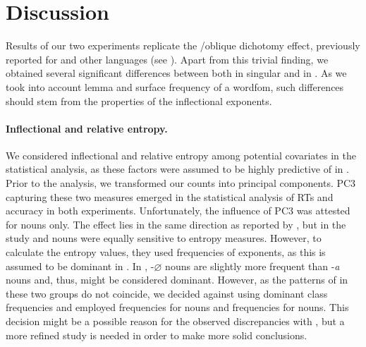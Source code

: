 \documentclass[output=paper, modfonts,newtxmath,hidelinks]{langscibook}
\begin{document}
\section{Discussion}
Results of our two experiments replicate the \slash oblique dichotomy effect, previously reported for  and other languages (see ). Apart from this trivial finding, we obtained several significant differences between   both in singular and in . As we took into account lemma and surface frequency of a wordfom, such   differences should stem from the properties of the inflectional exponents.\\

\paragraph*{Inflectional and relative entropy.} We considered inflectional and relative entropy among potential covariates in the statistical analysis, as these factors were assumed to be highly predictive of   in  \citep{milin2009simultaneous}. Prior to the analysis, we transformed our counts into principal components. PC3 capturing these two measures emerged in the statistical analysis of RTs and accuracy in both experiments. Unfortunately, the influence of PC3 was attested for  nouns only. The effect lies in the same direction as reported by \citet*{milin2009simultaneous}, but in the  study  and  nouns were equally sensitive to entropy measures. However, to calculate the entropy values, they used frequencies of  exponents, as this  is assumed to be dominant in . In ,  -$\varnothing$ nouns are slightly more frequent than  -\textit{a} nouns \citep{samojlova2014frequencies} and, thus, might be considered dominant. However, as the patterns of  in these two  groups do not coincide, we decided against using dominant class frequencies and employed  frequencies for  nouns and  frequencies for  nouns. This decision might be a possible reason for the observed discrepancies with \citet{milin2009simultaneous}, but a more refined study is needed in order to make more solid conclusions.\\
\end{document}
